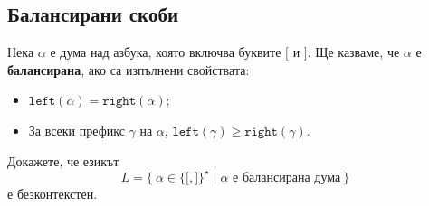 \subsection{Балансирани скоби}

Нека $\alpha$ е дума над азбука, която включва буквите $\texttt{[}$ и $\texttt{]}$. 
Ще казваме, че $\alpha$ е {\bf балансирана}, ако са изпълнени свойствата:
\begin{itemize}
\item 
  $\texttt{left}(\alpha) = \texttt{right}(\alpha)$;
\item
  За всеки префикс $\gamma$ на $\alpha$,
  $\texttt{left}(\gamma) \geq \texttt{right}(\gamma)$.
\end{itemize}

\begin{framed}
  \begin{problem}
    Докажете, че езикът 
    \[L = \{\ \alpha \in \{\texttt{[},\texttt{]}\}^\star \mid \alpha\text{ е балансирана дума}\ \}\]
    е безконтекстен.
  \end{problem}  
\end{framed}
